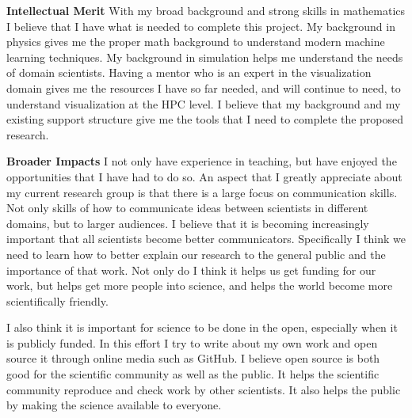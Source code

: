 \documentclass[12pt]{article}
\begin{document}
\textbf{Intellectual Merit}
%
With my broad background and strong skills in mathematics I believe that I have
what is needed to complete this project. My background in physics gives me the
proper math background to understand modern machine learning techniques. My
background in simulation helps me understand the needs of domain scientists.
Having a mentor who is an expert in the visualization domain gives me the
resources I have so far needed, and will continue to need, to understand
visualization at the HPC level. I believe that my background and my existing
support structure give me the tools that I need to complete the proposed
research.

\textbf{Broader Impacts}
%
I not only have experience in teaching, but have enjoyed the opportunities that
I have had to do so. An aspect that I greatly appreciate about my current
research group is that there is a large focus on communication skills. Not only
skills of how to communicate ideas between scientists in different domains, but
to larger audiences. I believe that it is becoming increasingly important that
all scientists become better communicators. Specifically I think we need to
learn how to better explain our research to the general public and the
importance of that work. Not only do I think it helps us get funding for our
work, but helps get more people into science, and helps the world become more
scientifically friendly. 

I also think it is important for science to be done in the open, especially when
it is publicly funded. In this effort I try to write about my own work and open
source it through online media such as GitHub. I believe open source is both
good for the scientific community as well as the public. It helps the scientific
community reproduce and check work by other scientists. It also helps the public
by making the science available to everyone. 
\end{document}
